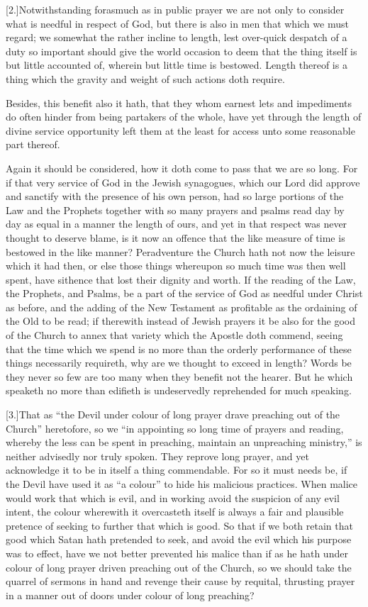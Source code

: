 [2.]Notwithstanding forasmuch as in public prayer we are not only to consider what is needful in respect of God, but there is also in men that which we must regard; we somewhat the rather incline to length, lest over-quick despatch of a duty so important should give the world occasion to deem that the thing itself is but little accounted of, wherein but little time is bestowed. Length thereof is a thing which the gravity and weight of such actions doth require.

Besides, this benefit also it hath, that they whom earnest lets and impediments do often hinder from being partakers of the whole, have yet through the length of divine service opportunity left them at the least for access unto some reasonable part thereof.

Again it should be considered, how it doth come to pass  that we are so long.
 For if that very service of God in the Jewish synagogues, which our Lord did approve and sanctify with the presence of his own person, had so large portions of the Law and the Prophets together with so many prayers and psalms read day by day as equal in a manner the length of ours, and yet in that respect was never thought to deserve blame, is it now an offence that the like measure of time is bestowed in the like manner? Peradventure the Church hath not now the leisure which it had then, or else those things whereupon so much time was then well spent, have sithence that lost their dignity and worth. If the reading of the Law, the Prophets, and Psalms, be a part of the service of God as needful under Christ as before, and the adding of the New Testament as profitable as the ordaining of the Old to be read; if therewith instead of Jewish prayers it be also for the good of the Church to annex that variety which the Apostle doth commend, seeing that the time which we spend is no more than the orderly performance of these things necessarily requireth, why are we thought to exceed in length? Words be they never so few are too many when they benefit not the hearer. But he which speaketh no more than edifieth is undeservedly reprehended for much speaking.

[3.]That as “the Devil under colour of long prayer drave preaching out of the Church” heretofore, so we “in appointing so long time of prayers and reading, whereby the less can be spent in preaching, maintain an unpreaching ministry,” is neither advisedly nor truly spoken. They reprove long prayer, and yet acknowledge it to be in itself a thing commendable. For so it must needs be, if the Devil have used it as “a colour” to hide his malicious practices. When malice would work that which is evil, and in working avoid  the suspicion of any evil intent, the colour wherewith it overcasteth itself is always a fair and plausible pretence of seeking to further that which is good.
 So that if we both retain that good which Satan hath pretended to seek, and avoid the evil which his purpose was to effect, have we not better prevented his malice than if as he hath under colour of long prayer driven preaching out of the Church, so we should take the quarrel of sermons in hand and revenge their cause by requital, thrusting prayer in a manner out of doors under colour of long preaching?

